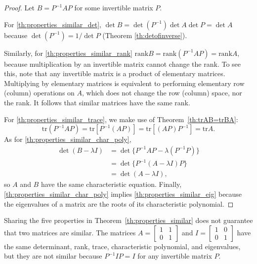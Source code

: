\documentclass{ximera}
\begin{document}
\begin{proof}
Let $B = P^{-1}AP$ for some invertible matrix $P$. 

For \ref{th:properties_similar_det}, $\det B = \det(P^{-1}) \det A \det P = \det A$ because $\det(P^{-1}) = 1/ \det P$ (Theorem \ref{th:detofinverse}). %

Similarly, for \ref{th:properties_similar_rank} $\mbox{rank} B = \mbox{rank}(P^{-1}AP) = \mbox{rank} A$, because multiplication by an invertible matrix cannot change the rank.  To see this, note that any invertible matrix is a product of elementary matrices.  Multiplying by elementary matrices is equivalent to performing elementary row (column) operations on $A$, which does not change the row (column) space, nor the rank.  It follows that similar matrices have the same rank. 

For \ref{th:properties_similar_trace}, we make use of Theorem~\ref{th:trAB=trBA}:
\begin{equation*}
\mbox{tr} (P^{-1}AP) = \mbox{tr}[P^{-1}(AP)] = \mbox{tr}[(AP)P^{-1}] = \mbox{tr} A.
\end{equation*}
As for \ref{th:properties_similar_char_poly},
\begin{align*}
\det(B-\lambda I) &= \det \{P^{-1}AP-\lambda(P^{-1}P)\} \\
&= \det \{ P^{-1}(A-\lambda I)P\} \\
&= \det (A-\lambda I),
\end{align*} so $A$ and $B$ have the same characteristic equation.
Finally, \ref{th:properties_similar_char_poly} implies \ref{th:properties_similar_eig} because the eigenvalues of a matrix are the roots of its characteristic polynomial.
\end{proof}

\begin{remark}\label{rem:fivePropSim}
Sharing the five properties in Theorem~\ref{th:properties_similar} does not guarantee that two matrices are similar. The matrices
$A = \begin{bmatrix}
1 & 1 \\
0 & 1
\end{bmatrix}$ and $I = \begin{bmatrix}
1 & 0 \\
0 & 1
\end{bmatrix}$ have the same determinant, rank, trace, characteristic polynomial, and eigenvalues, but they are not similar because $P^{-1}IP = I$ for any invertible matrix $P$.
\end{remark}
\end{document}
